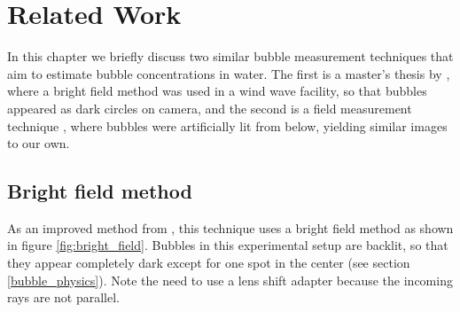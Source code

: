 \chapter{Related Work} \label{related_work}
 

In this chapter we briefly discuss two similar bubble measurement techniques that aim to estimate bubble concentrations in water. The first is a master's thesis by \citep{Leonie}, where a bright field method was used in a wind wave facility, so that bubbles appeared as dark circles on camera, and the second is a field measurement technique \citep{Al-Lashi2016}, where bubbles were artificially lit from below, yielding similar images to our own. 

\section{Bright field method}
	As an improved method from \citet{MischlerDiss}, this technique uses a bright field method as shown in figure \ref{fig:bright_field}. Bubbles in this experimental setup are backlit, so that they appear completely dark except for one spot in the center (see section  \ref{bubble_physics}). Note the need to use a lens shift adapter because the incoming rays are not parallel. 
	
